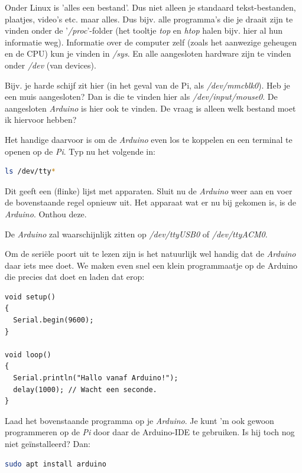 Onder Linux is 'alles een bestand'. Dus niet alleen je standaard tekst-bestanden, plaatjes, video's etc. maar alles. Dus bijv. alle programma's die je draait zijn te vinden onder de '\textit{/proc}'-folder (het tooltje \textit{top} en \textit{htop} halen bijv. hier al hun informatie weg). Informatie over de computer zelf (zoals het aanwezige geheugen en de CPU) kun je vinden in \textit{/sys}. En alle aangesloten hardware zijn te vinden onder \textit{/dev} (van devices). 

Bijv. je harde schijf zit hier (in het geval van de Pi, als \textit{/dev/mmcblk0}). Heb je een muis aangesloten? Dan is die te vinden hier als \textit{/dev/input/mouse0}. De aangesloten \textit{Arduino} is hier ook te vinden. De vraag is alleen welk bestand moet ik hiervoor hebben? \newline

Het handige daarvoor is om de \textit{Arduino} even los te koppelen en een terminal te openen op de \textit{Pi}. Typ nu het volgende in:
\begin{lstlisting}[language=bash]
ls /dev/tty*
\end{lstlisting}
Dit geeft een (flinke) lijst met apparaten. Sluit nu de \textit{Arduino} weer aan en voer de bovenstaande regel opnieuw uit. Het apparaat wat er nu bij gekomen is, is de \textit{Arduino}. Onthou deze.

\begin{remark}
  De \textit{Arduino} zal waarschijnlijk zitten op \textit{/dev/ttyUSB0} of \textit{/dev/ttyACM0}.
\end{remark}

\newpage 

Om de seriële poort uit te lezen zijn is het natuurlijk wel handig dat de \textit{Arduino} daar iets mee doet. We maken even snel een klein programmaatje op de Arduino die precies dat doet en laden dat erop:
\begin{lstlisting}[language=Arduino]
void setup() 
{
  Serial.begin(9600);
}

void loop() 
{
  Serial.println("Hallo vanaf Arduino!");
  delay(1000); // Wacht een seconde.
}
\end{lstlisting}
\begin{exercise}
  Laad het bovenstaande programma op je \textit{Arduino}. Je kunt 'm ook gewoon programmeren op de \textit{Pi} door daar de Arduino-IDE te gebruiken. Is hij toch nog niet geïnstalleerd? Dan:
  \begin{lstlisting}[language=bash]
  sudo apt install arduino
  \end{lstlisting}
\end{exercise}


